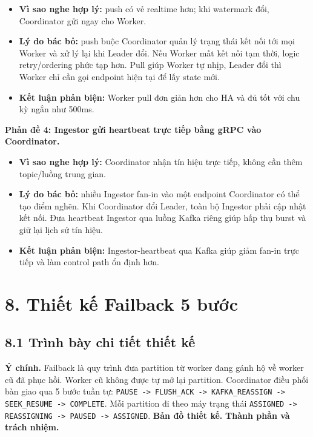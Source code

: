 \documentclass[12pt,a4paper]{article}
\begin{document}
\begin{itemize}
\item \textbf{Vì sao nghe hợp lý:} push có vẻ realtime hơn; khi watermark đổi, Coordinator gửi ngay cho Worker.
\item \textbf{Lý do bác bỏ:} push buộc Coordinator quản lý trạng thái kết nối tới mọi Worker và xử lý lại khi Leader đổi. Nếu Worker mất kết nối tạm thời, logic retry/ordering phức tạp hơn. Pull giúp Worker tự nhịp, Leader đổi thì Worker chỉ cần gọi endpoint hiện tại để lấy state mới.
\item \textbf{Kết luận phản biện:} Worker pull  đơn giản hơn cho HA và đủ tốt với chu kỳ ngắn như 500ms.
\end{itemize}
\textbf{Phản đề 4: Ingestor gửi heartbeat trực tiếp bằng gRPC vào Coordinator.}

\begin{itemize}
\item \textbf{Vì sao nghe hợp lý:} Coordinator nhận tín hiệu trực tiếp, không cần thêm topic/luồng trung gian.
\item \textbf{Lý do bác bỏ:} nhiều Ingestor fan-in vào một endpoint Coordinator có thể tạo điểm nghẽn. Khi Coordinator đổi Leader, toàn bộ Ingestor phải cập nhật kết nối. Đưa heartbeat Ingestor qua luồng Kafka riêng giúp hấp thụ burst và giữ lại lịch sử tín hiệu.
\item \textbf{Kết luận phản biện:} Ingestor-heartbeat qua Kafka giúp giảm fan-in trực tiếp và làm control path ổn định hơn.
\end{itemize}

\section{8. Thiết kế Failback 5 bước}
\label{sec:failback-5step}

\subsection{8.1 Trình bày chi tiết thiết kế}
\textbf{Ý chính.} Failback là quy trình đưa partition từ worker đang gánh hộ về worker cũ đã phục hồi. Worker cũ không được tự mở lại partition. Coordinator điều phối bàn giao qua 5 bước tuần tự: \texttt{PAUSE -> FLUSH\_ACK -> KAFKA\_REASSIGN -> SEEK\_RESUME -> COMPLETE}. Mỗi partition đi theo máy trạng thái \texttt{ASSIGNED -> REASSIGNING -> PAUSED -> ASSIGNED}.
\textbf{Bản đồ thiết kế.}
\textbf{Thành phần và trách nhiệm.}
\end{document}
